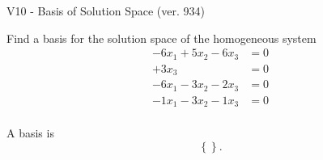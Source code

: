 \begin{exercise}
  \begin{exerciseTitle}V10 - Basis of Solution Space (ver. 934)\end{exerciseTitle}
  \begin{exerciseStatement}
    Find a basis for the solution space of the homogeneous system 
\begin{align*}
 -6 x_ 1 + 5 x_ 2 -6 x_ 3 &= 0  \\ 
  + 3 x_ 3 &= 0  \\ 
  -6 x_ 1 -3 x_ 2 -2 x_ 3 &= 0  \\ 
  -1 x_ 1 -3 x_ 2 -1 x_ 3 &= 0  \\ 
 \end{align*}


 
  \end{exerciseStatement}

  \begin{exerciseAnswer}
   A basis is   
\[\left\{\right\}.\]

  


  \end{exerciseAnswer}
\end{exercise}